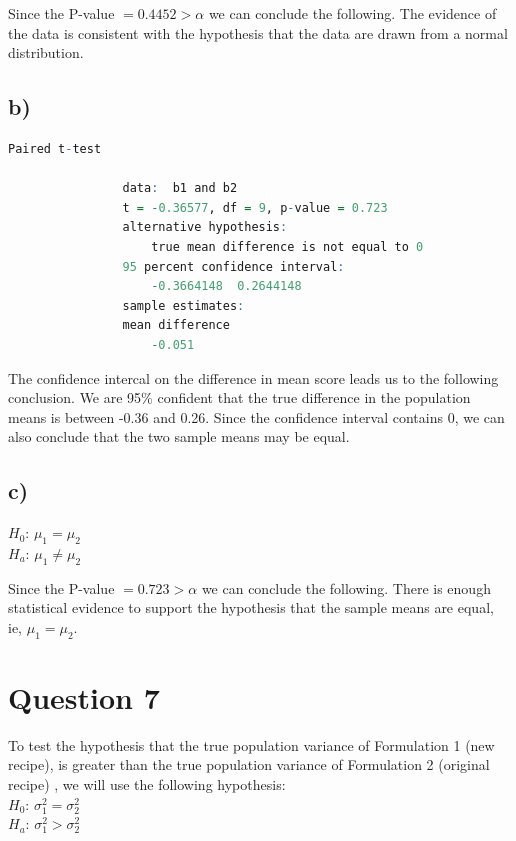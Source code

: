 \documentclass{article}
\begin{document}
Since the P-value $= 0.4452 > \alpha$ we can conclude the following.
    The evidence of the data is consistent with the hypothesis that the data are drawn from a normal distribution.


\subsection*{b)}

\begin{lstlisting}[language=R, caption=R output of a paired t test, basicstyle=\small]
                Paired t-test

                data:  b1 and b2
                t = -0.36577, df = 9, p-value = 0.723
                alternative hypothesis:
                    true mean difference is not equal to 0
                95 percent confidence interval:
                    -0.3664148  0.2644148
                sample estimates:
                mean difference 
                    -0.051 
\end{lstlisting}

The confidence intercal on the difference in mean score leads us to the following conclusion.
We are 95\% confident that the true difference in the population means is between -0.36 and 0.26.
Since the confidence interval contains 0, we can also conclude that the two sample means may be equal.

\subsection*{c)}

\begin{flushleft}
  $H_0$: $\mu_1 = \mu_2$ \\
  $H_a$: $\mu_1 \neq \mu_2$ \\
\end{flushleft}

Since the P-value $= 0.723 > \alpha$ we can conclude the following.
There is enough statistical evidence to support the hypothesis that the sample means are equal,
ie, $\mu_1 = \mu_2$.


\section*{Question 7}

To test the hypothesis that the true
population variance of Formulation 1 (new recipe),
is greater than the true population variance of Formulation 2 (original recipe)
, we will use the following hypothesis: \\
$H_0$: $\sigma_1^2 = \sigma_2^2$ \\
$H_a$: $\sigma_1^2 > \sigma_2^2$ \\
\end{document}
